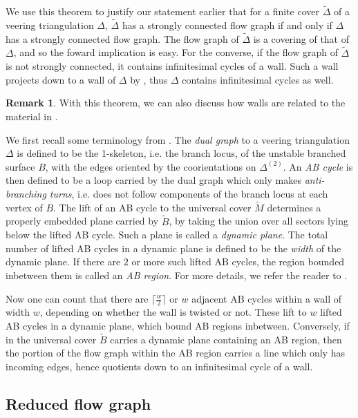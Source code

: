 \documentclass[12pt]{amsart}
\theoremstyle{definition}
\newtheorem{rmk}[thm]{Remark}
\numberwithin{equation}{section}
\begin{document}
We use this theorem to justify our statement earlier that for a finite cover $\widetilde{\Delta}$ of a veering triangulation $\Delta$, $\widetilde{\Delta}$ has a strongly connected flow graph if and only if $\Delta$ has a strongly connected flow graph. The flow graph of $\widetilde{\Delta}$ is a covering of that of $\Delta$, and so the foward implication is easy. For the converse, if the flow graph of $\widetilde{\Delta}$ is not strongly connected, it contains infinitesimal cycles of a wall. Such a wall projects down to a wall of $\Delta$ by , thus $\Delta$ contains infinitesimal cycles as well.

\begin{rmk} \label{rmk:LMTABwalls}
With this theorem, we can also discuss how walls are related to the material in \cite{LMT21}.

We first recall some terminology from \cite{LMT21}. The \textit{dual graph} to a veering triangulation $\Delta$ is defined to be the 1-skeleton, i.e. the branch locus, of the unstable branched surface $B$, with the edges oriented by the coorientations on $\Delta^{(2)}$. An \textit{AB cycle} is then defined to be a loop carried by the dual graph which only makes \textit{anti-branching turns}, i.e. does not follow components of the branch locus at each vertex of $B$. The lift of an AB cycle to the universal cover $\widetilde{M}$ determines a properly embedded plane carried by $\widetilde{B}$, by taking the union over all sectors lying below the lifted AB cycle. Such a plane is called a \textit{dynamic plane}. The total number of lifted AB cycles in a dynamic plane is defined to be the \textit{width} of the dynamic plane. If there are $2$ or more such lifted AB cycles, the region bounded inbetween them is called an \textit{AB region}. For more details, we refer the reader to \cite[Section 2.2, 3.1]{LMT21}.

Now one can count that there are $\lceil \frac{w}{2} \rceil$ or $w$ adjacent AB cycles within a wall of width $w$, depending on whether the wall is twisted or not. These lift to $w$ lifted AB cycles in a dynamic plane, which bound AB regions inbetween. Conversely, if in the universal cover $\widetilde{B}$ carries a dynamic plane containing an AB region, then the portion of the flow graph within the AB region carries a line which only has incoming edges, hence quotients down to an infinitesimal cycle of a wall.
\end{rmk}

\subsection{Reduced flow graph}
\end{document}
